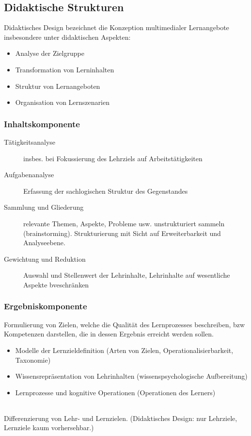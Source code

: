 \documentclass[a4paper]{article}
\begin{document}
\subsection{Didaktische Strukturen}

Didaktisches Design bezeichnet die Konzeption multimedialer Lernangebote insbesondere unter didaktischen Aspekten:
\begin{itemize}
	\item Analyse der Zielgruppe
	\item Transformation von Lerninhalten
	\item Struktur von Lernangeboten
	\item Organisation von Lernszenarien
\end{itemize}

\subsubsection{Inhaltskomponente}

\begin{description}
	\item[Tätigkeitsanalyse] insbes. bei Fokussierung des Lehrziels auf Arbeitstätigkeiten
	\item[Aufgabenanalyse] Erfassung der sachlogischen Struktur des Gegenstandes
	\item[Sammlung und Gliederung] relevante Themen, Aspekte, Probleme usw. unstrukturiert sammeln (brainstorming). Strukturierung mit Sicht auf Erweiterbarkeit und Analyseebene.
	\item[Gewichtung und Reduktion] Auswahl und Stellenwert der Lehrinhalte, Lehrinhalte auf wesentliche Aspekte bveschränken
\end{description}

\subsubsection{Ergebniskomponente}

Formulierung von Zielen, welche die Qualität des Lernprozesses beschreiben, bzw Kompetenzen darstellen, die in dessen Ergebnis erreicht werden sollen.
\begin{itemize}
	\item Modelle der Lernzieldefinition (Arten von Zielen, Operationalisierbarkeit, Taxonomie)
	\item Wissensrepräsentation von Lehrinhalten (wissenspsychologische Aufbereitung)
	\item Lernprozesse und kognitive Operationen (Operationen des Lerners)
\end{itemize}
~\\
Differenzierung von Lehr- und Lernzielen. (Didaktisches Design: nur Lehrziele, Lernziele kaum vorhersehbar.)
\end{document}
